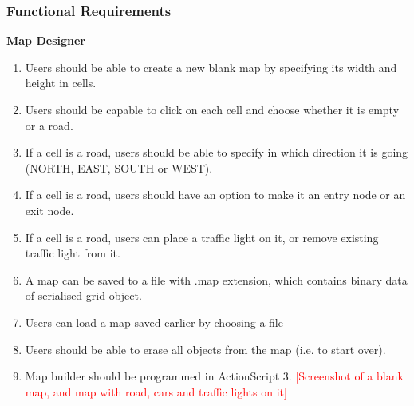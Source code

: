\documentclass{article}
\begin{document}
\subsubsection{Functional Requirements}
{\bf Map Designer}
\begin{enumerate}
	\item Users should be able to create a new blank map by specifying its width and height in cells. 
	\item Users should be capable to click on each cell and choose whether it is empty or a road.
	\item If a cell is a road, users should be able to specify in which direction it is going (NORTH, EAST, SOUTH or WEST).
	\item If a cell is a road, users should have an option to make it an entry node or an exit node.
	\item If a cell is a road, users can place a traffic light on it, or remove existing traffic light from it. 
	\item A map can be saved to a file with .map extension, which contains binary data of serialised grid object.
	\item Users can load a map saved earlier by choosing a file \item  Users should be able to erase all objects from the map (i.e. to start over). 
	\item Map builder should be programmed in ActionScript 3. 
	\textcolor{red}{[Screenshot of a blank map, and map with road, cars and traffic lights on it]}
\end{enumerate}
\end{document}
